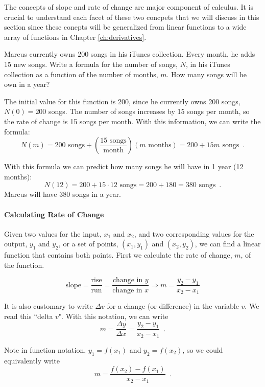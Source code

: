 The concepts of slope and rate of change are major component of calculus. It is crucial to understand each facet of these two concpets that we will discuss in this section since these conepts will be generalized from linear functions to a wide array of functions in Chapter \ref{ch:derivatives}.

\begin{example}
Marcus currently owns 200 songs in his iTunes collection. Every month, he adds 15 new songs. Write a formula for the number of songs, $N$, in his iTunes collection as a function of the number of months, $m$. How many songs will he own in a year?

\solution The initial value for this function is 200, since he currently owns 200 songs, $N(0)=200$ songs. The number of songs increases by 15 songs per month, so the rate of change is 15 songs per month. With this information, we can write the formula:
$$N(m) = 200 \mbox{ songs} + \left(\frac{15\mbox{ songs}}{\mbox{month}}\right)(m \mbox{ months}) = 200 + 15m \mbox{ songs} \enspace .$$

With this formula we can predict how many songs he will have in 1 year (12 months):
$$N(12) = 200 + 15\cdot 12\mbox{ songs}  = 200 + 180 = 380 \mbox{ songs}  \enspace .$$
Marcus will have 380 songs in a year.
\end{example}


\paragraph{Calculating Rate of Change}

Given two values for the input, $x_1$ and $x_2$, and two corresponding values for the output, $y_1$ and $y_2$, or a set of points, $(x_1, y_1)$ and $(x_2, y_2)$, we can find a linear function that contains both points. First we calculate the rate of change, $m$, of the function.

$$\mbox{slope}=\frac{\mbox{rise}}{\mbox{run}}=\frac{\mbox{change in } y}{\mbox{change in } x} \Rightarrow m = \frac{y_2-y_1}{x_2-x_1}$$

It is also customary to write $\Delta v$ for a change (or difference) in the variable $v$. We read this ``delta $v$". With this notation, we can write
$$m=\frac{\Delta y }{\Delta x} = \frac{y_2-y_1}{x_2-x_1}\enspace .$$

Note in function notation, $y_1 = f(x_1)$ and $y_2 = f(x_2)$, so we could equivalently write
$$m=\frac{f(x_2)-f(x_1)}{x_2-x_1}\enspace .$$

